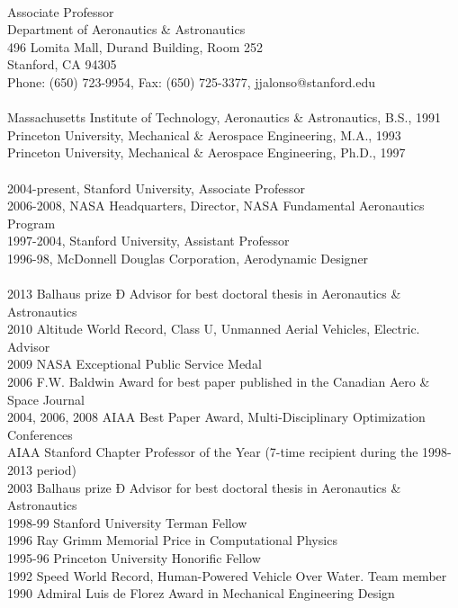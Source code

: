  \\
Associate Professor \\
Department of Aeronautics \& Astronautics \\
496 Lomita Mall, Durand Building, Room 252 \\
Stanford, CA 94305 \\
Phone: (650) 723-9954, Fax: (650) 725-3377, jjalonso@stanford.edu \\

 \\
Massachusetts Institute of Technology,  Aeronautics \& Astronautics,            B.S., 1991  \\
Princeton University,                   Mechanical \& Aerospace Engineering,    M.A., 1993  \\
Princeton University,                   Mechanical \& Aerospace Engineering,    Ph.D., 1997  \\

  \\
2004-present, Stanford University, Associate Professor \\
2006-2008, NASA Headquarters, Director, NASA Fundamental Aeronautics Program  \\
1997-2004, Stanford University, Assistant Professor  \\
1996-98, McDonnell Douglas Corporation, Aerodynamic Designer  \\

 \\
2013 Balhaus prize Ð Advisor for best doctoral thesis in Aeronautics \& Astronautics \\
2010 Altitude World Record, Class U, Unmanned Aerial Vehicles, Electric.  Advisor \\
2009 NASA Exceptional Public Service Medal\\
2006 F.W. Baldwin Award for best paper published in the Canadian Aero \& Space Journal\\
2004, 2006, 2008 AIAA Best Paper Award, Multi-Disciplinary Optimization Conferences\\
AIAA Stanford Chapter Professor of the Year (7-time recipient during the 1998-2013 period) \\
2003 Balhaus prize Ð Advisor for best doctoral thesis in Aeronautics \& Astronautics\\
1998-99 Stanford University Terman Fellow\\
1996 Ray Grimm Memorial Price in Computational Physics\\
1995-96 Princeton University Honorific Fellow\\
1992 Speed World Record, Human-Powered Vehicle Over Water.  Team member\\
1990 Admiral Luis de Florez Award in Mechanical Engineering Design\\

